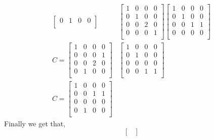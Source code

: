 \documentclass[12pt]{article}
\makeatletter
\theoremstyle{homework}
\newenvironment{exercise}[1]
{\def\@currentlabel{#1}\exercisecore}
{\endexercisecore}
\makeatother
\begin{document}
\begin{exercise}{4}
\begin{enumerate}
\begin{align*}
\begin{bmatrix}
                0 & 1 & 0 & 0\\
            \end{bmatrix}
            &
            \begin{bmatrix}
                1 & 0 & 0 & 0\\
                0 & 1 & 0 & 0\\
                0 & 0 & 2 & 0\\
                0 & 0 & 0 & 1\\
            \end{bmatrix}
            \begin{bmatrix}
                1 & 0 & 0 & 0\\
                0 & 1 & 0 & 0\\
                0 & 0 & 1 & 1\\
                0 & 0 & 0 & 0\\
            \end{bmatrix}\\
            C = 
            \begin{bmatrix}
                1 & 0 & 0 & 0\\
                0 & 0 & 0 & 1\\
                0 & 0 & 2 & 0\\
                0 & 1 & 0 & 0\\
            \end{bmatrix}
            &
            \begin{bmatrix}
                1 & 0 & 0 & 0\\
                0 & 1 & 0 & 0\\
                0 & 0 & 0 & 0\\
                0 & 0 & 1 & 1\\
            \end{bmatrix}\\
            C = 
            \begin{bmatrix}
                1 & 0 & 0 & 0\\
                0 & 0 & 1 & 1\\
                0 & 0 & 0 & 0\\
                0 & 1 & 0 & 0\\
            \end{bmatrix}
        \end{align*}
        Finally we get that, 
        \begin{equation*} 
        \begin{bmatrix}

\end{bmatrix}
\end{equation*}
\end{enumerate}
\end{exercise}
\end{document}
